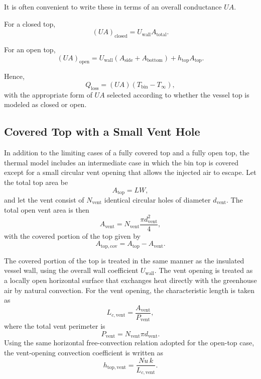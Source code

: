\documentclass{article}
\begin{document}
It is often convenient to write these in terms of an overall conductance $UA$.

For a closed top,
\begin{equation}
(UA)_{\text{closed}}
=
U_{\text{wall}}A_{\text{total}}.
\end{equation}

For an open top,
\begin{equation}
(UA)_{\text{open}}
=
U_{\text{wall}}(A_{\text{side}}+A_{\text{bottom}})
+
h_{\text{top}}A_{\text{top}}.
\end{equation}

Hence,
\begin{equation}
Q_{\text{loss}} = (UA)(T_{\text{bin}}-T_{\infty}),
\end{equation}
with the appropriate form of $UA$ selected according to whether the vessel
top is modeled as closed or open.

\subsection{Covered Top with a Small Vent Hole}

In addition to the limiting cases of a fully covered top and a fully open
top, the thermal model includes an intermediate case in which the bin top is
covered except for a small circular vent opening that allows the injected air
to escape. Let the total top area be
\begin{equation}
    A_{\mathrm{top}} = L W,
\end{equation}
and let the vent consist of $N_{\mathrm{vent}}$ identical circular holes of
diameter $d_{\mathrm{vent}}$. The total open vent area is then
\begin{equation}
    A_{\mathrm{vent}} = N_{\mathrm{vent}} \frac{\pi d_{\mathrm{vent}}^2}{4},
\end{equation}
with the covered portion of the top given by
\begin{equation}
    A_{\mathrm{top,cov}} = A_{\mathrm{top}} - A_{\mathrm{vent}}.
\end{equation}

The covered portion of the top is treated in the same manner as the insulated
vessel wall, using the overall wall coefficient $U_{\mathrm{wall}}$. The vent
opening is treated as a locally open horizontal surface that exchanges heat
directly with the greenhouse air by natural convection. For the vent opening,
the characteristic length is taken as
\begin{equation}
    L_{c,\mathrm{vent}} = \frac{A_{\mathrm{vent}}}{P_{\mathrm{vent}}},
\end{equation}
where the total vent perimeter is
\begin{equation}
    P_{\mathrm{vent}} = N_{\mathrm{vent}} \pi d_{\mathrm{vent}}.
\end{equation}
Using the same horizontal free-convection relation adopted for the open-top
case, the vent-opening convection coefficient is written as
\begin{equation}
    h_{\mathrm{top,vent}} = \frac{Nu\,k}{L_{c,\mathrm{vent}}}.
\end{equation}
\end{document}
